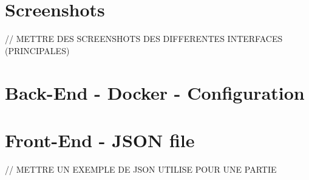\documentclass{tnreport}
\begin{document}
\cleardoublepage

\chapter{Screenshots}

// METTRE DES SCREENSHOTS DES DIFFERENTES INTERFACES (PRINCIPALES) \\

\cleardoublepage

\chapter{Back-End - Docker - Configuration}
\label{annexe:docker_compose}
\vspace{0.5cm}
\begin{center}
	\vspace*{-0.8in}
	
\end{center}

\cleardoublepage

\chapter{Front-End - JSON file}

// METTRE UN EXEMPLE DE JSON UTILISE POUR UNE PARTIE \\
\end{document}

